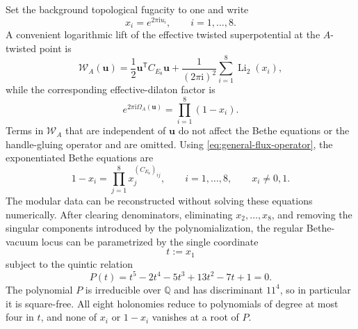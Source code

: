\documentclass[11pt,a4paper]{article}
\numberwithin{equation}{section}
\begin{document}
Set the background topological fugacity to one and write
\begin{equation}
  x_i=e^{2\pi \mathrm{i} u_i},
  \qquad i=1,\ldots,8.
\end{equation}
A convenient logarithmic lift of the effective twisted superpotential at the $A$-twisted point is
\begin{equation}
  \mathcal W_A(\boldsymbol u)
  =\frac12\boldsymbol u^{\mathsf T}C_{E_8}\boldsymbol u
  +\frac{1}{(2\pi\mathrm{i})^2}
  \sum_{i=1}^{8}\operatorname{Li}_2(x_i),
  \label{eq:CE8-A-twisted-superpotential}
\end{equation}
while the corresponding effective-dilaton factor is
\begin{equation}
  e^{2\pi\mathrm{i}\Omega_A(\boldsymbol u)}
  =\prod_{i=1}^{8}(1-x_i).
  \label{eq:CE8-A-effective-dilaton}
\end{equation}
Terms in $\mathcal W_A$ that are independent of $\boldsymbol u$ do not affect the Bethe equations or the handle-gluing operator and are omitted.  Using \eqref{eq:general-flux-operator}, the exponentiated Bethe equations are
\begin{equation}
  1-x_i
  =\prod_{j=1}^{8}x_j^{(C_{E_8})_{ij}},
  \qquad
  i=1,\ldots,8,
  \qquad
  x_i\neq0,1.
  \label{eq:CE8-Bethe-equations}
\end{equation}
The modular data can be reconstructed without solving these equations numerically.  After clearing denominators, eliminating $x_2,\ldots,x_8$, and removing the singular components introduced by the polynomialization, the regular Bethe-vacuum locus can be parametrized by the single coordinate
\begin{equation}
  t:=x_1
\end{equation}
subject to the quintic relation
\begin{equation}
  P(t)
  =t^5-2t^4-5t^3+13t^2-7t+1=0.
  \label{eq:CE8-Bethe-quintic}
\end{equation}
The polynomial $P$ is irreducible over $\mathbb Q$ and has discriminant $11^4$, so in particular it is square-free.  All eight holonomies reduce to polynomials of degree at most four in $t$, and none of $x_i$ or $1-x_i$ vanishes at a root of $P$.
\end{document}
